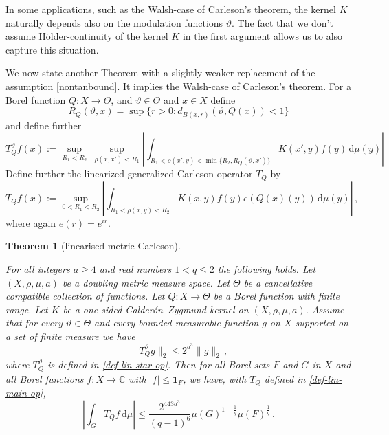 \documentclass[10pt,a4paper]{article}
\theoremstyle{plain}
\newtheorem{theorem}{Theorem}[subsection]
\theoremstyle{definition}
\numberwithin{equation}{subsection}
\newcommand{\tQ}{{Q}}
\newcommand{\mfa}{{\vartheta}}
\newcommand{\Mf}{{\Theta}}
\newcommand{\lean}[1]{}
\newcommand{\uses}[1]{}
\newcommand{\leanok}{}
\def\C{\mathbb{C}}
\begin{document}
In some applications, such as the Walsh-case of Carleson's theorem, the kernel $K$ naturally depends also on the modulation functions $\mfa$.
The fact that we don't assume H\"older-continuity of the kernel $K$ in the first argument allows us to also capture this situation.

We now state another Theorem with a slightly weaker replacement of the assumption \eqref{nontanbound}.
It implies the Walsh-case of Carleson's theorem.
For a Borel function $\tQ:X\to \Mf$, and $\mfa \in \Mf$ and $x\in X$ define
\begin{equation}
    R_{\tQ}(\mfa,x)=\sup\{r>0:d_{B(x,r)}(\mfa, \tQ(x))<1\}
\end{equation}
and define further
\begin{equation}
    \label{def-lin-star-op}
    T_{\tQ}^\mfa f(x):=\sup_{R_1<R_2} \ \sup_{\rho(x,x')<R_1}
    \left|\int_{R_1< \rho(x',y) < \min\{R_2, R_{\tQ}(\mfa,x')\}} K(x',y) f(y) \, \mathrm{d}\mu(y) \right|
\end{equation}
Define further the linearized generalized Carleson operator $T_\tQ$ by
\begin{equation}
    \label{def-lin-main-op}
    T_\tQ f(x):= \sup_{0 < R_1 < R_2}\left| \int_{R_1 < \rho(x,y) < R_2} K(x,y) f(y) e(\tQ(x)(y)) \, \mathrm{d}\mu(y) \right|\, ,
\end{equation}
where again $e(r)=e^{ir}$.

\begin{theorem}[linearised metric Carleson]
\label{linearised-metric-Carleson}
\uses{R-truncation,int-continuous}
\leanok
\lean{linearized_metric_carleson}
    For all integers $a \ge 4$ and real numbers $1<q\le 2$ the following holds.
    Let $(X,\rho,\mu,a)$ be a doubling metric measure space. Let $\Mf$ be a
    cancellative compatible collection of functions.
    Let $\tQ:X\to \Mf$ be a Borel function with finite range.
    Let $K$ be a one-sided Calder\'on--Zygmund kernel on $(X,\rho,\mu,a)$. Assume that for every $\mfa\in \Mf$ and every bounded measurable function $g$ on $X$ supported on a set of finite measure we have
    \begin{equation}\label{linnontanbound}
        \|T_{\tQ}^\mfa g\|_{2} \leq 2^{a^3} \|g\|_2\,,
    \end{equation}
    where $T_{\tQ}^\mfa$ is defined in \eqref{def-lin-star-op}.
    Then for all Borel sets $F$ and $G$ in $X$ and all Borel functions $f:X\to \C$ with
    $|f|\le \mathbf{1}_F$, we have, with $T_\tQ$ defined in \eqref{def-lin-main-op},
    \begin{equation}
        \label{linresweak}
        \left|\int_{G} T_\tQ f \, \mathrm{d}\mu\right| \le \frac{2^{443a^3}}{(q-1)^6} \mu(G)^{1-\frac{1}{q}} \mu(F)^{\frac{1}{q}}\, .
    \end{equation}
\end{theorem}
\end{document}
